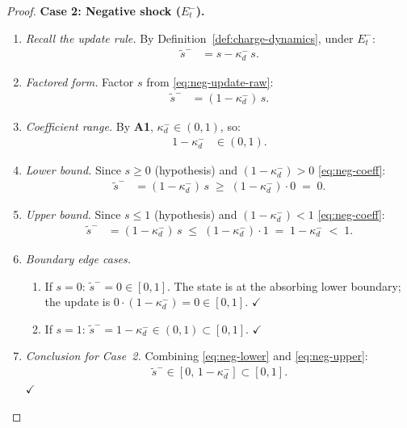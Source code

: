 \documentclass[12pt,openany]{book}
\numberwithin{equation}{chapter}
\theoremstyle{plain}
\theoremstyle{definition}
\theoremstyle{remark}
\begin{document}
\begin{proof}
\medskip
\noindent\textbf{Case 2: Negative shock ($E_t^{-}$).}
\begin{enumerate}
  \item \emph{Recall the update rule.}
    By Definition~\ref{def:charge-dynamics}, under $E_t^{-}$:
    \begin{align}
      \tilde{s}^{-} &= s - \kappa_d^{-}\,s.
      \label{eq:neg-update-raw}
    \end{align}
  \item \emph{Factored form.}
    Factor $s$ from \eqref{eq:neg-update-raw}:
    \begin{align}
      \tilde{s}^{-} &= (1 - \kappa_d^{-})\,s.
      \label{eq:neg-factored}
    \end{align}
  \item \emph{Coefficient range.}
    By \textbf{A1}, $\kappa_d^{-} \in (0,1)$, so:
    \begin{align}
      1 - \kappa_d^{-} &\in (0,1).
      \label{eq:neg-coeff}
    \end{align}
  \item \emph{Lower bound.}
    Since $s \geq 0$ (hypothesis) and
    $(1-\kappa_d^{-}) > 0$ \eqref{eq:neg-coeff}:
    \begin{align}
      \tilde{s}^{-}
        &= (1-\kappa_d^{-})\,s
         \;\geq\; (1-\kappa_d^{-})\cdot 0
         \;=\; 0.
      \label{eq:neg-lower}
    \end{align}
  \item \emph{Upper bound.}
    Since $s \leq 1$ (hypothesis) and
    $(1-\kappa_d^{-}) < 1$ \eqref{eq:neg-coeff}:
    \begin{align}
      \tilde{s}^{-}
        &= (1-\kappa_d^{-})\,s
         \;\leq\; (1-\kappa_d^{-})\cdot 1
         \;=\; 1 - \kappa_d^{-}
         \;<\; 1.
      \label{eq:neg-upper}
    \end{align}
  \item \emph{Boundary edge cases.}
    \begin{enumerate}
      \item If $s = 0$: $\tilde{s}^{-} = 0 \in [0,1]$.
        The state is at the absorbing lower boundary; the update
        is $0\cdot(1-\kappa_d^{-}) = 0 \in [0,1]$.  $\checkmark$
      \item If $s = 1$: $\tilde{s}^{-} = 1 - \kappa_d^{-}
        \in (0,1) \subset [0,1]$.  $\checkmark$
    \end{enumerate}
  \item \emph{Conclusion for Case~2.}
    Combining \eqref{eq:neg-lower} and \eqref{eq:neg-upper}:
    \begin{align}
      \tilde{s}^{-} \in [0,\,1-\kappa_d^{-}] \subset [0,1].
      \label{eq:neg-conclusion}
    \end{align}
    $\checkmark$
\end{enumerate}


\end{proof}
\end{document}
